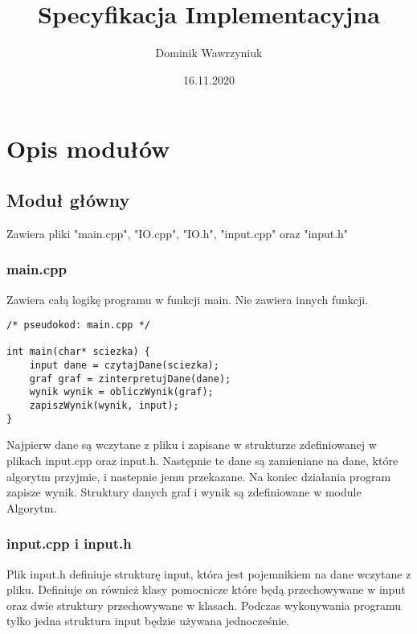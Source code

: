 \documentclass{article}
\title{Specyfikacja Implementacyjna}
\date{16.11.2020}
\author{Dominik Wawrzyniuk}
\begin{document}
\lstset{language=C++}
\maketitle

\section{Opis modułów}

\subsection{Moduł główny}

Zawiera pliki "main.cpp", "IO.cpp", "IO.h", "input.cpp" oraz "input.h"

\subsubsection{main.cpp}

Zawiera całą logikę programu w funkcji main. Nie zawiera innych funkcji.

\begin{lstlisting}
/* pseudokod: main.cpp */

int main(char* sciezka) {
	input dane = czytajDane(sciezka);
	graf graf = zinterpretujDane(dane);
	wynik wynik = obliczWynik(graf);
	zapiszWynik(wynik, input);
}
\end{lstlisting}

Najpierw dane są wczytane z pliku i zapisane w strukturze zdefiniowanej w plikach input.cpp oraz input.h. Następnie te dane są zamieniane na dane, które algorytm przyjmie, i nastepnie jemu przekazane. Na koniec działania program zapisze wynik. Struktury danych graf i wynik są zdefiniowane w module Algorytm.

\subsubsection{input.cpp i input.h}

Plik input.h definiuje strukturę input, która jest pojemnikiem na dane wczytane z pliku. Definiuje on również klasy pomocnicze które będą przechowywane w input oraz dwie struktury przechowywane w klasach. Podczas wykonywania programu tylko jedna struktura input będzie używana jednocześnie.

\paragraph{}
\end{document}
